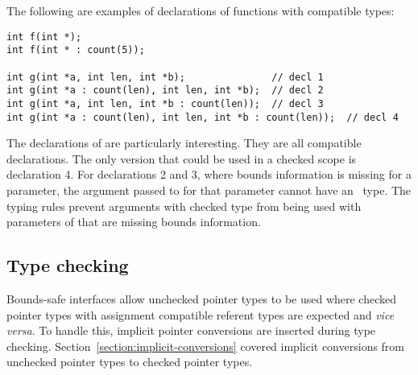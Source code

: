 The following are examples of declarations of functions with compatible types:
\begin{lstlisting}
int f(int *);
int f(int * : count(5));

int g(int *a, int len, int *b);               // decl 1
int g(int *a : count(len), int len, int *b);  // decl 2
int g(int *a, int len, int *b : count(len));  // decl 3
int g(int *a : count(len), int len, int *b : count(len));  // decl 4
\end{lstlisting}
The declarations of  are particularly interesting. They are all
compatible declarations.  The only version
that could be used in a checked scope is declaration 4.   For declarations 2 and 3,
where bounds information is missing for a parameter, the argument passed to 
for that parameter cannot have an \arrayptr\ type.  The typing rules prevent arguments
with checked type from being used with parameters of  that are missing
bounds information.

\subsection{Type checking}
\label{section:bounds-safe-interface-type-checking}

Bounds-safe interfaces allow unchecked pointer types to be used
where checked pointer types with assignment compatible referent types are
expected and {\it vice versa}.
To handle this, implicit pointer conversions are inserted during type checking.
Section~\ref{section:implicit-conversions} covered implicit conversions from unchecked pointer types to checked pointer types.

